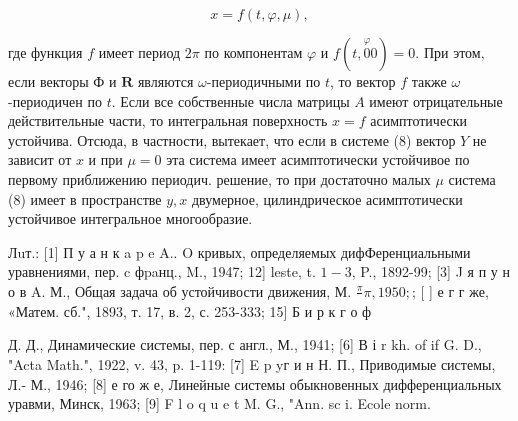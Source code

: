 \documentclass[10pt]{article}
\begin{document}
\[

x=f(t, \varphi, \mu),

\]



где функция $f$ имеет период $2 \pi$ по компонентам $\varphi$ и $f(t, \stackrel{\varphi}{0} 0)=0$. При этом, если векторы Ф и $\boldsymbol{R}$ являются $\omega$-периодичными по $t$, то вектор $f$ также $\omega$-периодичен по $t$. Если все собственные числа матрицы $A$ имеют отрицательные действительные части, то интегральная поверхность $x=f$ асимптотически устойчива. Отсюда, в частности, вытекает, что если в системе (8) вектор $Y$ не зависит от $x$ и при $\mu=0$ эта система имеет асимптотически устойчивое по первому приближению периодич. решение, то при достаточно малых $\mu$ система (8) имеет в пространстве $y, x$ двумерное, цилиндрическое асимптотически устойчивое интегральное многообразие.



Лuт.: [1] П у а н к a p e A.. O кривых, определяемых дифФеренциальными уравнениями, пер. c фpaнц., M., 1947; 12] leste, t. $1-3$, P., 1892-99; [3] J я п у н о в A. М., Общая задача об устойчивости движения, М. $\frac{\pi}{} \pi, 1950 ;$; [ ] е г г же, «Матем. сб.", 1893, т. 17, в. 2, с. 253-333; 15] Б и р к г о ф

Д. Д., Динамические системы, пер. с англ., М., 1941; [6] В і r kh. of if G. D., "Acta Math.", 1922, v. 43, p. 1-119: [7] E p yг и н Н. П., Приводимые системы, Л.- М., 1946; [8] е го ж е, Линейные системы обыкновенных дифференциальных уравми, Минск, 1963; [9] F l o q u e t M. G., "Ann. sc i. Ecole norm.
\end{document}
